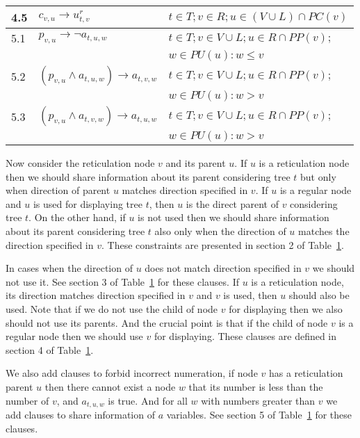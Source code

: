 \documentclass[runningheads, envcountsame, a4paper]{llncs}
\begin{document}
\begin{table}[t]
{\begin{tabular}{l | l | l}
  4.5 &
  $c_{v,u} \rightarrow u^r_{t,v}$ &
  $t \in T; v \in R; u \in \left(V \cup L\right) \cap PC(v)$
  \\

  \hline
  5.1 &
  $p_{v,u} \rightarrow \neg a_{t,u,w}$ &
  $t \in T; v \in V \cup L; u \in R \cap PP(v);$
  \\ & & \quad$w \in PU(u): w \leq v$
  \\
  
  5.2 &
  $(p_{v,u} \wedge a_{t,u,w}) \rightarrow a_{t,v,w}$ &
  $t \in T; v \in V \cup L; u \in R \cap PP(v);$
  \\ & & \quad$w \in PU(u): w > v$
  \\
  
  5.3 &
  $(p_{v,u} \wedge a_{t,v,w}) \rightarrow a_{t,u,w}$ &
  $t \in T; v \in V \cup L; u \in R \cap PP(v);$
  \\ & & \quad$w \in PU(u): w > v$
  \\

\end{tabular}
}
\label{child-parent-table}
\end{table}

Now consider the reticulation node $v$ and its parent $u$. If $u$ is a reticulation node then we should share information 
about its parent considering tree $t$ but only when direction of parent $u$ matches direction specified in $v$. 
If $u$ is a regular node and $u$ is used for displaying tree $t$, then $u$ is the direct parent of $v$ considering tree $t$.
On the other hand, if $u$ is not used then we should share information about its parent considering tree $t$ also 
only when the direction of $u$ matches the direction specified in $v$. These constraints are presented in section 2 of Table~\ref{child-parent-table}.

In cases when the direction of $u$ does not match direction specified in $v$ we should not use it. See section 3 of Table~\ref{child-parent-table} 
for these clauses. If $u$ is a reticulation node, its direction matches direction specified in $v$ and $v$ is used, then $u$ should also be used.
Note that if we do not use the child of node $v$ for displaying then we also should not use its parents. And the crucial point is that
if the child of node $v$ is a regular node then we should use $v$ for displaying. 
These clauses are defined in section 4 of Table~\ref{child-parent-table}.

We also add clauses to forbid incorrect numeration, if node $v$ has a reticulation parent $u$ then there cannot 
exist a node $w$ that its number is less than the number of $v$, and $a_{t,u,w}$ is true. And for all $w$ with numbers 
greater than $v$ we add clauses to share information of $a$ variables. See section 5 of Table~\ref{child-parent-table} for these clauses.
\end{document}
